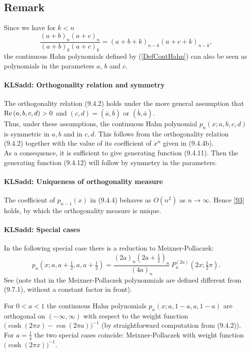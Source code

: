 \documentclass[envcountchap,graybox]{svmono}
\newcounter{rom}
\newcommand\thalf{\tfrac12}
\newcommand\iy\infty
\renewcommand\Re{{\rm Re}\,}
\begin{document}
\subsection*{Remark}
Since we have for $k<n$
$$\frac{(a+b)_n(a+c)_n}{(a+b)_k(a+c)_k}=(a+b+k)_{n-k}(a+c+k)_{n-k},$$
the continuous Hahn polynomials defined by (\ref{DefContHahn}) can also be seen as polynomials
in the parameters $a$, $b$ and $c$.
%
\paragraph{\large\bf KLSadd: Orthogonality relation and symmetry}The orthogonality relation (9.4.2) holds under the more general assumption that
$\Re(a,b,c,d)>0$ and $(c,d)=(\overline a,\overline b)$ or $(\overline b,\overline a)$.\\
Thus, under these assumptions, the continuous Hahn polynomial
$p_n(x;a,b,c,d)$
is symmetric in $a,b$ and in $c,d$.
This follows from the orthogonality relation (9.4.2)
together with the value of its coefficient of $x^n$ given in (9.4.4b).\\
As a consequence, it is sufficient to give generating function (9.4.11). Then the generating
function (9.4.12) will follow by symmetry in the parameters.
%
\paragraph{\large\bf KLSadd: Uniqueness of orthogonality measure}The coefficient of $p_{n-1}(x)$ in (9.4.4) behaves as $O(n^2)$ as $n\to\iy$.
Hence \eqref{93} holds, by which the orthogonality measure is unique.
%
\paragraph{\large\bf KLSadd: Special cases}In the following special case there is a reduction to
Meixner-Pollaczek:
\begin{equation}
p_n(x;a,a+\thalf,a,a+\thalf)=
\frac{(2a)_n (2a+\thalf)_n}{(4a)_n}\,P_n^{(2a)}(2x;\thalf\pi).
\end{equation}
See  (note that in  the
Meixner-Pollaczek polynonmials are defined different from (9.7.1),
without a constant factor in front).

For $0<a<1$ the continuous Hahn polynomials $p_n(x;a,1-a,a,1-a)$
are orthogonal on $(-\iy,\iy)$ with respect to the weight function
$\big(\cosh(2\pi x)-\cos(2\pi a)\big)^{-1}$
(by straightforward computation from (9.4.2)).
For $a=\tfrac14$ the two special cases coincide:
Meixner-Pollaczek with weight function $\big(\cosh(2\pi x)\big)^{-1}$.
%
\end{document}

